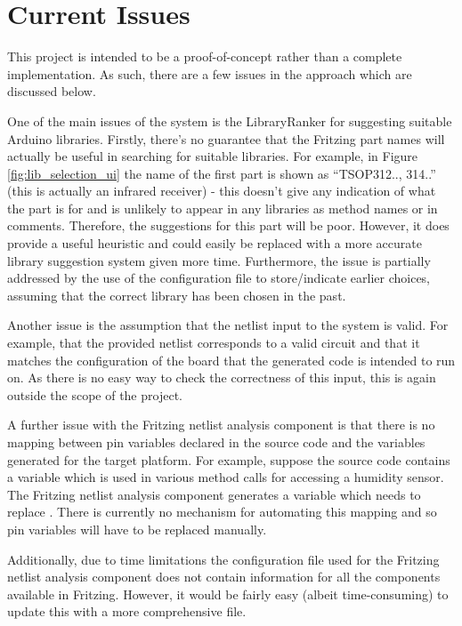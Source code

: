 \documentclass{UoYCSproject}
\begin{document}
\section{Current Issues} \label{limits_to_des}
This project is intended to be a proof-of-concept rather than a complete implementation. As such, there are a few issues in the approach which are discussed below.

One of the main issues of the system is the LibraryRanker for suggesting suitable Arduino libraries. Firstly, there's no guarantee that the Fritzing part names will actually be useful in searching for suitable libraries. For example, in Figure \ref{fig:lib_selection_ui} the name of the first part is shown as ``TSOP312.., 314..'' (this is actually an infrared receiver) - this doesn't give any indication of what the part is for and is unlikely to appear in any libraries as method names or in comments. Therefore, the suggestions for this part will be poor. However, it does provide a useful heuristic and could easily be replaced with a more accurate library suggestion system given more time. Furthermore, the issue is partially addressed by the use of the configuration file to store/indicate earlier choices, assuming that the correct library has been chosen in the past.

Another issue is the assumption that the netlist input to the system is valid. For example, that the provided netlist corresponds to a valid circuit and that it matches the configuration of the board that the generated code is intended to run on. As there is no easy way to check the correctness of this input, this is again outside the scope of the project.

A further issue with the Fritzing netlist analysis component is that there is no mapping between pin variables declared in the source code and the variables generated for the target platform. For example, suppose the source code contains a variable  which is used in various method calls for accessing a humidity sensor. The Fritzing netlist analysis component generates a variable  which needs to replace . There is currently no mechanism for automating this mapping and so pin variables will have to be replaced manually.

Additionally, due to time limitations the configuration file used for the Fritzing netlist analysis component does not contain information for all the components available in Fritzing. However, it would be fairly easy (albeit time-consuming) to update this with a more comprehensive file.
\end{document}
